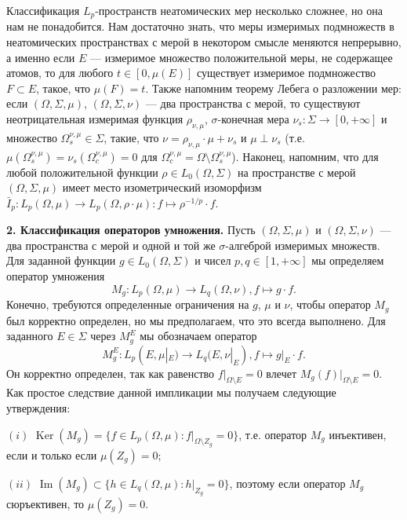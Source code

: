 \documentclass[11pt,twoside]{article}
\begin{document}
Классификация $L_p$-пространств неатомических мер несколько сложнее, но она нам
не понадобится. Нам достаточно знать, что меры измеримых подмножеств в
неатомических пространствах с мерой в некотором смысле меняются непрерывно, а
именно если $E$ --- измеримое множество положительной меры, не содержащее
атомов, то для любого $t\in[0,\mu(E)]$  существует измеримое подмножество
$F\subset E$, такое, что $\mu(F)=t$. Также напомним теорему Лебега о разложении
мер: если $(\Omega,\Sigma,\mu)$, $(\Omega,\Sigma,\nu)$ --- два пространства с
мерой, то существуют неотрицательная измеримая функция $\rho_{\nu,\mu}$,
$\sigma$-конечная мера $\nu_s:\Sigma\to[0,+\infty]$ и множество
$\Omega_s^{\nu,\mu}\in\Sigma$, такие, что $\nu=\rho_{\nu,\mu}\cdot\mu+\nu_s$ и
$\mu\perp\nu_s$ (т.е. $\mu(\Omega_s^{\nu,\mu})=\nu_s(\Omega_c^{\nu,\mu})=0$ для
$\Omega_c^{\nu,\mu}=\Omega\setminus \Omega_s^{\nu,\mu}$). Наконец, напомним, что
для любой положительной функции $\rho\in L_0(\Omega,\Sigma)$ на пространстве с
мерой $(\Omega,\Sigma,\mu)$ имеет место изометрический изоморфизм
$\bar{I}_p:L_p(\Omega,\mu)\to
    L_p(\Omega,\rho\cdot\mu):f\mapsto \rho^{-1/p}\cdot f$.









\textbf{2. Классификация операторов умножения.} Пусть $(\Omega,\Sigma,\mu)$ и
$(\Omega,\Sigma,\nu)$ --- два пространства с мерой и одной и той же
$\sigma$-алгеброй измеримых множеств. Для заданной функции 
$g\in L_0(\Omega,\Sigma)$ и чисел $p,q\in[1,+\infty]$ 
мы определяем оператор умножения
$$
    M_g:L_p(\Omega,\mu)\to L_q(\Omega,\nu), f\mapsto g\cdot f.
$$
Конечно, требуются определенные ограничения на $g$, $\mu$ и $\nu$, чтобы
оператор $M_g$ был корректно определен, но мы предполагаем, что это всегда
выполнено. Для заданного $E\in\Sigma$ через $M_g^E$ мы обозначаем оператор
$$
    M_g^E:L_p(E,\mu|_E)\to L_q(E,\nu|_E),f\mapsto g|_E\cdot f.
$$
Он корректно определен, так как равенство $f|_{\Omega\setminus E}=0$ влечет
$M_g(f)|_{\Omega\setminus E}=0$. Как простое следствие данной импликации мы
получаем следующие утверждения:

$(i)$ $\operatorname{Ker}(M_g)
    =\{f\in L_p(\Omega,\mu):f|_{\Omega\setminus Z_g}=0\}$, т.е. оператор $M_g$
инъективен, если и только если $\mu(Z_g)=0$;

$(ii)$ $\operatorname{Im}(M_g)\subset \{h\in L_q(\Omega,\mu): h|_{Z_g}=0 \}$,
поэтому если оператор $M_g$ сюръективен, то $\mu(Z_g)=0$.
\end{document}
